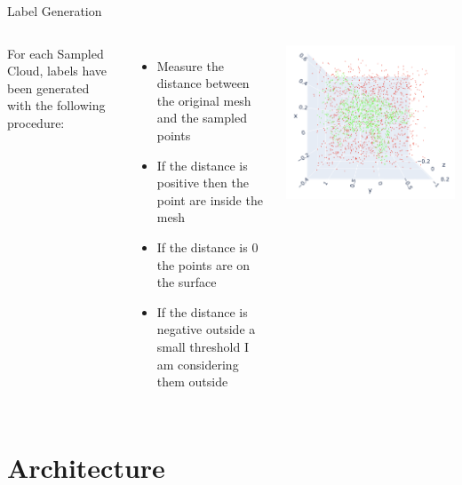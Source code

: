 \documentclass{beamer}
\begin{document}
\begin{frame}{Label Generation}
  \begin{columns}[T]
      For each Sampled Cloud, labels have been generated with the following procedure:
      \begin{itemize}
        \item Measure the distance between the original mesh and the sampled points
        \item If the distance is positive then the point are inside the mesh
        \item If the distance is $0$ the points are on the surface
        \item If the distance is negative outside a small threshold I am considering them outside
      \end{itemize}
  
      \vspace{-2em}
      \centering
      \includegraphics[width=0.9\linewidth]{../Media/example/sampled_cloud.png}
  \end{columns}
\end{frame}

\section{Architecture}
\end{document}
